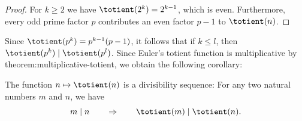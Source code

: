 \begin{proof}
  For $k\geq 2$ we have $\totient(2^k)=2^{k-1}$, which is even. Furthermore, every odd prime factor $p$ contributes an even factor $p-1$ to $\totient(n)$.
\end{proof}

Since $\totient(p^k)=p^{k-1}(p-1)$, it follows that if $k\leq l$, then $\totient(p^k)\mid \totient(p^l)$. Since Euler's totient function is multiplicative by {theorem:multiplicative-totient}, we obtain the following corollary:

\begin{corollary}
  The function $n\mapsto\totient(n)$ is a divisibility sequence: For any two natural numbers $m$ and $n$, we have
  \begin{equation*}
    m\mid n\qquad\Rightarrow\qquad \totient(m)\mid\totient(n).
  \end{equation*}
\end{corollary}

